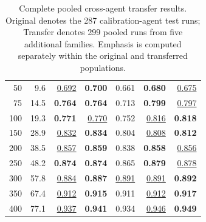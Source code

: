 \begin{table}[t]
\begin{tabular}{rrrrrrr}
    50 & 9.6 & \underline{0.692} & \textbf{0.700} & 0.661 & \textbf{0.680} & \underline{0.675} \\
    75 & 14.5 & \textbf{0.764} & \textbf{0.764} & 0.713 & \textbf{0.799} & \underline{0.797} \\
    100 & 19.3 & \textbf{0.771} & \underline{0.770} & 0.752 & \underline{0.816} & \textbf{0.818} \\
    150 & 28.9 & \underline{0.832} & \textbf{0.834} & 0.804 & \underline{0.808} & \textbf{0.812} \\
    200 & 38.5 & \underline{0.857} & \textbf{0.859} & 0.838 & \textbf{0.858} & \underline{0.856} \\
    250 & 48.2 & \textbf{0.874} & \textbf{0.874} & 0.865 & \textbf{0.879} & \underline{0.878} \\
    300 & 57.8 & \underline{0.884} & \textbf{0.887} & \underline{0.891} & \underline{0.891} & \textbf{0.892} \\
    350 & 67.4 & \underline{0.912} & \textbf{0.915} & 0.911 & \underline{0.912} & \textbf{0.917} \\
    400 & 77.1 & \underline{0.937} & \textbf{0.941} & 0.934 & \underline{0.946} & \textbf{0.949} \\
    \bottomrule
  \end{tabular}
  \caption{Complete pooled cross-agent transfer results. Original denotes the 287 calibration-agent test runs; Transfer denotes 299 pooled runs from five additional families. Emphasis is computed separately within the original and transferred populations.}
  \label{tab:transfer-pooled-complete}
\end{table}
